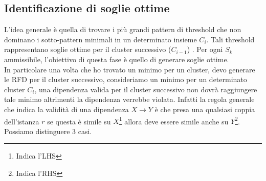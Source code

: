 \subsection{Identificazione di soglie ottime}
L'idea generale è quella di trovare i più grandi pattern di threshold che non dominano i sotto-pattern minimali in un determinato insieme $C_{i}$. Tali threshold rappresentano soglie ottime per il cluster successivo ($C_{i-1}$) . Per ogni $S_{k}$ ammissibile, l'obiettivo di questa fase è quello di generare soglie ottime.\\
In particolare una volta che ho trovato un minimo per un cluster, devo generare le RFD per il cluster successivo, consideriamo un minimo per un determinato cluster $C_{i}$, una dipendenza valida per il cluster successivo non dovrà raggiungere tale minimo altrimenti la dipendenza verrebbe violata. Infatti la regola generale che indica la validità di una dipendenza $X \rightarrow Y$ è che presa una qualsiasi coppia dell'istanza $r$ se questa è simile su $X$\footnote{Indica l'LHS} allora deve essere simile anche su $Y$\footnote{Indica l'RHS}. Possiamo distinguere 3 casi.
